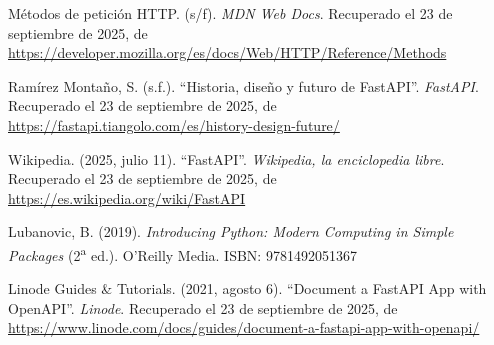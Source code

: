 \documentclass[12pt]{article}
\begin{document}
\begin{thebibliography}{99}

 M\'etodos de petici\'on HTTP. (s/f). \textit{MDN Web Docs}. Recuperado el 23 de septiembre de 2025, de \url{https://developer.mozilla.org/es/docs/Web/HTTP/Reference/Methods}

 Ram\'irez Monta\~no, S. (s.f.). ``Historia, dise\~no y futuro de FastAPI''. \textit{FastAPI}. Recuperado el 23 de septiembre de 2025, de \url{https://fastapi.tiangolo.com/es/history-design-future/}

 Wikipedia. (2025, julio 11). ``FastAPI''. \textit{Wikipedia, la enciclopedia libre}. Recuperado el 23 de septiembre de 2025, de \url{https://es.wikipedia.org/wiki/FastAPI}

 Lubanovic, B. (2019). \textit{Introducing Python: Modern Computing in Simple Packages} (2\textsuperscript{a} ed.). O'Reilly Media. ISBN: 9781492051367

 Linode Guides \& Tutorials. (2021, agosto 6). ``Document a FastAPI App with OpenAPI''. \textit{Linode}. Recuperado el 23 de septiembre de 2025, de \url{https://www.linode.com/docs/guides/document-a-fastapi-app-with-openapi/}

\end{thebibliography}
\end{document}
